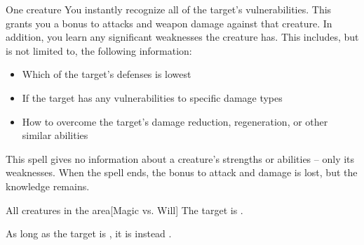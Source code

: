 \begin{spellheader}
    \spellrng{\rngmed}
    \spelldur{\durshort}
\end{spellheader}
\begin{spelleffects}
    \begin{spelltarget}{One creature}
        \spelleffect You instantly recognize all of the target's vulnerabilities. This grants you a  bonus to attacks and weapon damage against that creature. In addition, you learn any significant weaknesses the creature has. This includes, but is not limited to, the following information:
        \begin{itemize}
            \item Which of the target's defenses is lowest
            \item If the target has any vulnerabilities to specific damage types
            \item How to overcome the target's damage reduction, regeneration, or other similar abilities
        \end{itemize}
    \end{spelltarget}
\end{spelleffects}
\begin{spellfooter}
    \spellnotes This spell gives no information about a creature's strengths or abilities -- only its weaknesses. When the spell ends, the bonus to attack and damage is lost, but the knowledge remains.
\end{spellfooter}

\begin{spellheader}
\end{spellheader}
\begin{spelleffects}
    \begin{spelltarget}{All creatures in the area}[Magic vs. Will]
        \spellsuccess The target is \bewildered.

        As long as the target is \bloodied, it is instead \confused.
    \end{spelltarget}
\end{spelleffects}

